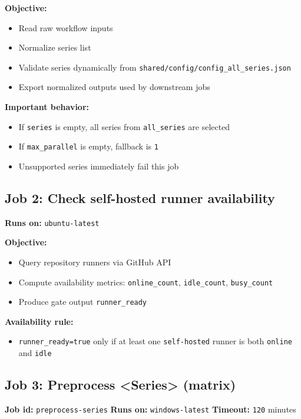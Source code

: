 \documentclass[11pt,a4paper]{article}
\begin{document}
\textbf{Objective:}
\begin{itemize}
  \item Read raw workflow inputs
  \item Normalize series list
  \item Validate series dynamically from \texttt{shared/config/config\_all\_series.json}
  \item Export normalized outputs used by downstream jobs
\end{itemize}

\textbf{Important behavior:}
\begin{itemize}
  \item If \texttt{series} is empty, all series from \texttt{all\_series} are selected
  \item If \texttt{max\_parallel} is empty, fallback is \texttt{1}
  \item Unsupported series immediately fail this job
\end{itemize}

\subsection{Job 2: Check self-hosted runner availability}
\textbf{Runs on:} \texttt{ubuntu-latest}

\textbf{Objective:}
\begin{itemize}
  \item Query repository runners via GitHub API
  \item Compute availability metrics:
  \texttt{online\_count}, \texttt{idle\_count}, \texttt{busy\_count}
  \item Produce gate output \texttt{runner\_ready}
\end{itemize}

\textbf{Availability rule:}
\begin{itemize}
  \item \texttt{runner\_ready=true} only if at least one \texttt{self-hosted} runner is both \texttt{online} and \texttt{idle}
\end{itemize}

\subsection{Job 3: Preprocess <Series> (matrix)}
\textbf{Job id:} \texttt{preprocess-series}\newline
\textbf{Runs on:} \texttt{windows-latest}\newline
\textbf{Timeout:} \texttt{120} minutes
\end{document}
